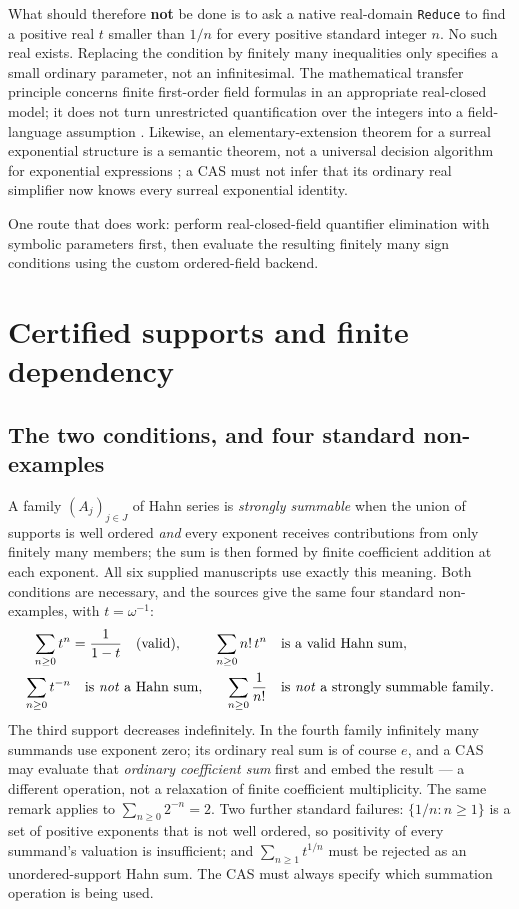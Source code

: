 \documentclass[11pt,letterpaper]{article}
\numberwithin{equation}{section}
\theoremstyle{definition}
\theoremstyle{remark}
\begin{document}
What should therefore \textbf{not} be done is to ask a native real-domain
\texttt{Reduce} to find a positive real $t$ smaller than $1/n$ for every
positive standard integer $n$. No such real exists. Replacing the condition by
finitely many inequalities only specifies a small ordinary parameter, not an
infinitesimal. The mathematical transfer principle concerns finite first-order
field formulas in an appropriate real-closed model; it does not turn unrestricted
quantification over the integers into a field-language assumption
\cite{cas:SourcePolynomial,cas:PerrucciRoy}. Likewise, an elementary-extension
theorem for a surreal exponential structure is a semantic theorem, not a
universal decision algorithm for exponential expressions \cite{cas:vdDE}; a CAS
must not infer that its ordinary real simplifier now knows every surreal
exponential identity.

One route that does work: perform real-closed-field quantifier elimination with
symbolic parameters first, then evaluate the resulting finitely many sign
conditions using the custom ordered-field backend.

\section{Certified supports and finite dependency}
\label{cas:sec-support}

\subsection{The two conditions, and four standard non-examples}
\label{cas:sub-twoconditions}
A family $(A_j)_{j\in J}$ of Hahn series is \emph{strongly summable} when the
union of supports is well ordered \emph{and} every exponent receives
contributions from only finitely many members; the sum is then formed by finite
coefficient addition at each exponent. All six supplied manuscripts use exactly
this meaning. Both conditions are necessary, and the sources give the same four
standard non-examples, with $t=\omega^{-1}$:
\begin{align*}
 \sum_{n\ge0}t^n&=\frac1{1-t}\quad\text{(valid)}, &
 \sum_{n\ge0}n!\,t^n&\quad\text{is a valid Hahn sum},\\
 \sum_{n\ge0}t^{-n}&\quad\text{is \emph{not} a Hahn sum}, &
 \sum_{n\ge0}\frac1{n!}&\quad\text{is \emph{not} a strongly summable family}.
\end{align*}
The third support decreases indefinitely. In the fourth family infinitely many
summands use exponent zero; its ordinary real sum is of course $e$, and a CAS
may evaluate that \emph{ordinary coefficient sum} first and embed the result ---
a different operation, not a relaxation of finite coefficient multiplicity. The
same remark applies to $\sum_{n\ge0}2^{-n}=2$. Two further standard failures:
$\{1/n:n\ge1\}$ is a set of positive exponents that is not well ordered, so
positivity of every summand's valuation is insufficient; and $\sum_{n\ge1}t^{1/n}$
must be rejected as an unordered-support Hahn sum. The CAS must always specify
which summation operation is being used.
\end{document}
